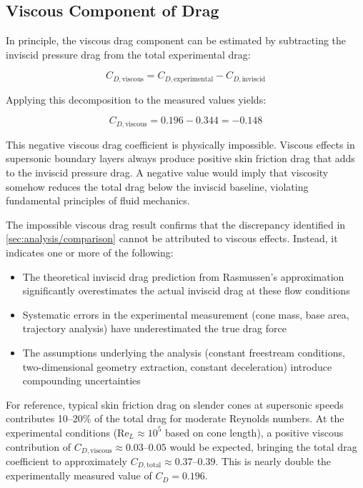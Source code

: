 \subsection{Viscous Component of Drag} \label{sec:analysis/viscous}

In principle, the viscous drag component can be estimated by subtracting the inviscid pressure drag from the total experimental drag:

\begin{equation}
    C_{D,\text{viscous}} = C_{D,\text{experimental}} - C_{D,\text{inviscid}}
\end{equation}

Applying this decomposition to the measured values yields:

\begin{equation}
    C_{D,\text{viscous}} = 0.196 - 0.344 = -0.148
\end{equation}

This negative viscous drag coefficient is physically impossible. Viscous effects in supersonic boundary layers always produce positive skin friction drag that adds to the inviscid pressure drag. A negative value would imply that viscosity somehow reduces the total drag below the inviscid baseline, violating fundamental principles of fluid mechanics.

The impossible viscous drag result confirms that the discrepancy identified in \cref{sec:analysis/comparison} cannot be attributed to viscous effects. Instead, it indicates one or more of the following:

\begin{itemize}
    \item The theoretical inviscid drag prediction from Rasmussen's approximation significantly overestimates the actual inviscid drag at these flow conditions
    \item Systematic errors in the experimental measurement (cone mass, base area, trajectory analysis) have underestimated the true drag force
    \item The assumptions underlying the analysis (constant freestream conditions, two-dimensional geometry extraction, constant deceleration) introduce compounding uncertainties
\end{itemize}

For reference, typical skin friction drag on slender cones at supersonic speeds contributes 10--20\% of the total drag for moderate Reynolds numbers. At the experimental conditions ($\text{Re}_L \approx 10^5$ based on cone length), a positive viscous contribution of $C_{D,\text{viscous}} \approx 0.03$--$0.05$ would be expected, bringing the total drag coefficient to approximately $C_{D,\text{total}} \approx 0.37$--$0.39$. This is nearly double the experimentally measured value of $C_D = 0.196$.


